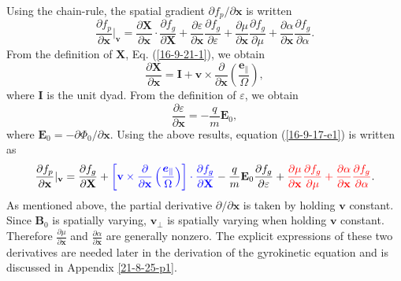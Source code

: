 \documentclass{llncs}
\newcommand{\nobracket}{}
\newcommand{\tmcolor}[2]{{\color{#1}{#2}}}
\newcommand{\tmmathbf}[1]{\ensuremath{\boldsymbol{#1}}}
\begin{document}
Using the chain-rule, the spatial gradient $\partial f_p / \partial
\mathbf{x}$ is written
\begin{equation}
  \label{16-9-17-e1} \frac{\partial f_p}{\partial \mathbf{x}} |_{\mathbf{v}}
  \nobracket = \frac{\partial \mathbf{X}}{\partial \mathbf{x}} \cdot
  \frac{\partial f_g}{\partial \mathbf{X}} + \frac{\partial
  \varepsilon}{\partial \mathbf{x}}  \frac{\partial f_g}{\partial \varepsilon}
  + \frac{\partial \mu}{\partial \mathbf{x}}  \frac{\partial f_g}{\partial
  \mu} + \frac{\partial \alpha}{\partial \mathbf{x}}  \frac{\partial
  f_g}{\partial \alpha} .
\end{equation}
From the definition of $\mathbf{X}$, Eq. (\ref{16-9-21-1}), we obtain
\begin{equation}
  \frac{\partial \mathbf{X}}{\partial \mathbf{x}} =\mathbf{I}+\mathbf{v}
  \times \frac{\partial}{\partial \mathbf{x}} \left(
  \frac{\tmmathbf{e}_{\parallel}}{\Omega} \right),
\end{equation}
where $\mathbf{I}$ is the unit dyad. From the definition of $\varepsilon$, we
obtain
\begin{equation}
  \frac{\partial \varepsilon}{\partial \mathbf{x}} = - \frac{q}{m}
  \mathbf{E}_0,
\end{equation}
where $\mathbf{E}_0 = - \partial \Phi_0 / \partial \mathbf{x}$. Using the
above results, equation (\ref{16-9-17-e1}) is written as
\begin{equation}
  \label{22-9-24-p1} \frac{\partial f_p}{\partial \mathbf{x}} |_{\mathbf{v}}
  \nobracket = \frac{\partial f_g}{\partial \mathbf{X}} +
  \tmcolor{blue}{\left[ \mathbf{v} \times \frac{\partial}{\partial \mathbf{x}}
  \left( \frac{\tmmathbf{e}_{\parallel}}{\Omega} \right) \right] \cdot
  \frac{\partial f_g}{\partial \mathbf{X}}} - \frac{q}{m} \mathbf{E}_0
  \frac{\partial f_g}{\partial \varepsilon} + \tmcolor{red}{\frac{\partial
  \mu}{\partial \mathbf{x}}  \frac{\partial f_g}{\partial \mu} +
  \frac{\partial \alpha}{\partial \mathbf{x}}  \frac{\partial f_g}{\partial
  \alpha}} .
\end{equation}
As mentioned above, the partial derivative $\partial / \partial \mathbf{x}$ is
taken by holding $\mathbf{v}$ constant. Since $\mathbf{B}_0$ is spatially
varying, $\mathbf{v}_{\perp}$ is spatially varying when holding $\mathbf{v}$
constant. Therefore $\frac{\partial \mu}{\partial \mathbf{x}}$ and
$\frac{\partial \alpha}{\partial \mathbf{x}}$ are generally nonzero. The
explicit expressions of these two derivatives are needed later in the
derivation of the gyrokinetic equation and is discussed in Appendix
\ref{21-8-25-p1}.
\end{document}
